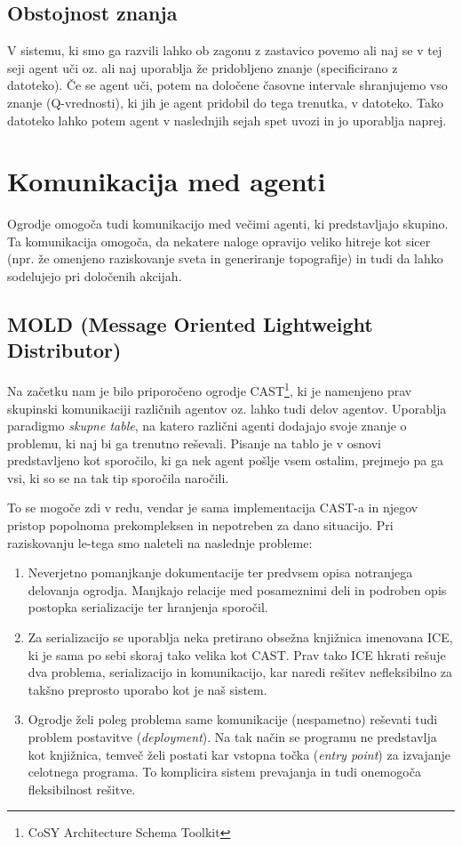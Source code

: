 \documentclass[a4paper,10pt]{article}
\begin{document}
\subsection{Obstojnost znanja}
V sistemu, ki smo ga razvili lahko ob zagonu z zastavico povemo ali naj se v tej seji agent uči oz. ali naj uporablja že pridobljeno znanje (specificirano
z datoteko). 
Če se agent uči, potem na določene časovne intervale shranjujemo vso znanje (Q-vrednosti), ki jih je agent pridobil do tega trenutka, v datoteko. Tako datoteko lahko potem
agent v naslednjih sejah spet uvozi in jo uporablja naprej.

\section{Komunikacija med agenti}

Ogrodje omogoča tudi komunikacijo med večimi agenti, ki predstavljajo skupino. Ta komunikacija omogoča, da nekatere naloge opravijo veliko hitreje kot sicer (npr. že omenjeno raziskovanje sveta in generiranje topografije) in tudi da lahko sodelujejo pri določenih akcijah.

\subsection{MOLD (Message Oriented Lightweight Distributor)}

Na začetku nam je bilo priporočeno ogrodje CAST\footnote{CoSY Architecture Schema Toolkit}, ki je namenjeno prav skupinski komunikaciji različnih agentov oz. lahko tudi delov agentov. Uporablja paradigmo \textit{skupne table}, na katero različni agenti dodajajo svoje znanje o problemu, ki naj bi ga trenutno reševali. Pisanje na tablo je v osnovi predstavljeno kot sporočilo, ki ga nek agent pošlje vsem ostalim, prejmejo pa ga vsi, ki so se na tak tip sporočila naročili.

To se mogoče zdi v redu, vendar je sama implementacija CAST-a in njegov pristop popolnoma prekompleksen in nepotreben za dano situacijo. Pri raziskovanju le-tega smo naleteli na naslednje probleme:
\begin{enumerate}
  \item Neverjetno pomanjkanje dokumentacije ter predvsem opisa notranjega delovanja ogrodja. Manjkajo relacije med posameznimi deli in podroben opis postopka serializacije ter hranjenja sporočil.
  
  \item Za serializacijo se uporablja neka pretirano obsežna knjižnica imenovana ICE, ki je sama po sebi skoraj tako velika kot CAST. Prav tako ICE hkrati rešuje dva problema, serializacijo in komunikacijo, kar naredi rešitev nefleksibilno za takšno preprosto uporabo kot je naš sistem.
  
  \item Ogrodje želi poleg problema same komunikacije (nespametno) reševati tudi problem postavitve (\textit{deployment}). Na tak način se programu ne predstavlja kot knjižnica, temveč želi postati kar vstopna točka (\textit{entry point}) za izvajanje celotnega programa. To komplicira sistem prevajanja in tudi onemogoča fleksibilnost rešitve.
\end{enumerate}
\end{document}
